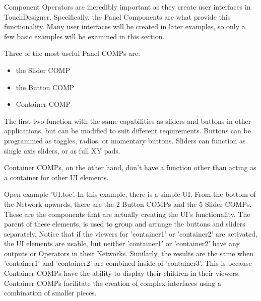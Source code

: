 \begin{fullwidth}
Component Operators are incredibly important as they create user interfaces in TouchDesigner. Specifically, the Panel Components are what provide this functionality. Many user interfaces will be created in later examples, so only a few basic examples will be examined in this section. 

Three of the most useful Panel COMPs are:

\begin{itemize}
\item the Slider COMP
\item the Button COMP
\item Container COMP
\end{itemize}

The first two function with the same capabilities as sliders and buttons in other applications, but can be modified to suit different requirements. Buttons can be programmed as toggles, radios, or momentary buttons. Sliders can function as single axis sliders, or as full XY pads. 

Container COMPs, on the other hand, don't have a function other than acting as a container for other UI elements. 

Open example 'UI.toe'. In this example, there is a simple UI. From the bottom of the Network upwards, there are the 2 Button COMPs and the 5 Slider COMPs. These are the components that are actually creating the UI's functionality. The parent of these elements, is used to group and arrange the buttons and sliders separately. Notice that if the viewers for 'container1' or 'container2' are activated, the UI elements are usable, but neither 'container1' or 'container2' have any outputs or Operators in their Networks. Similarly, the results are the same when 'container1' and 'container2' are combined inside of 'container3'. This is because Container COMPs have the ability to display their children in their viewers. Container COMPs facilitate the creation of complex interfaces using a combination of smaller pieces.


\end{fullwidth}